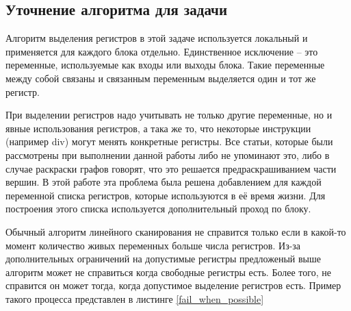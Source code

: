 \documentclass[a4paper,14pt]{extarticle}
\begin{document}

\subsection{Уточнение алгоритма для задачи}

Алгоритм выделения регистров в этой задаче используется локальный и применяется для каждого блока отдельно.
Единственное исключение -- это переменные, используемые как входы или выходы блока.
Такие переменные между собой связаны и связанным переменным выделяется один и тот же регистр.

При выделении регистров надо учитывать не только другие переменные, но и явные использования регистров, а така же то, что некоторые инструкции (например div) могут менять конкретные регистры.
Все статьи, которые были рассмотрены при выполнении данной работы либо не упоминают это, либо в случае раскраски графов говорят, что это решается предраскрашиванием части вершин.
В этой работе эта проблема была решена добавлением для каждой переменной списка регистров, которые используются в её время жизни.
Для построения этого списка используется дополнительный проход по блоку.

Обычный алгоритм линейного сканирования не справится только если в какой-то момент количество живых переменных больше числа регистров.
Из-за дополнительных ограничений на допустимые регистры предложеный выше алгоритм может не справиться когда свободные регистры есть.
Более того, не справится он может тогда, когда допустимое выделение регистров есть.
Пример такого процесса представлен в листинге \ref{fail_when_possible}
\end{document}
